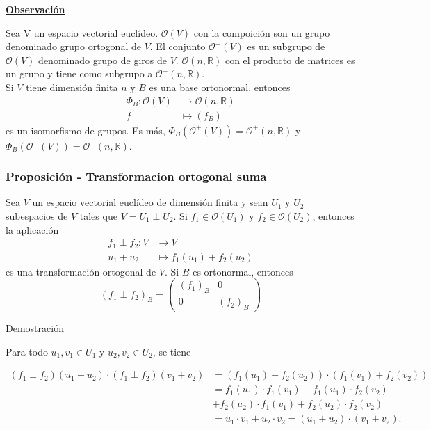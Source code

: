 \documentclass[12pt, a4paper, ones, notitlepage, openany,titlepage]{article}
\newcommand{\demostracion}{\noindent\underline{Demostración}}
\newcommand{\observacion}{\noindent\underline{\textbf{Observación}}}
\begin{document}
\observacion

Sea V un espacio vectorial euclídeo. $\mathcal{O}(V)$ con la compoición son un grupo denominado grupo ortogonal de $V$. El conjunto $\mathcal{O}^+(V)$ es un subgrupo de $\mathcal{O}(V)$ denominado grupo de giros de $V$. $\mathcal{O}(n,\mathbb{R})$ con el producto de matrices es un grupo y tiene como subgrupo a $\mathcal{O}^+(n, \mathbb{R})$.\\
Si $V$ tiene dimensión finita $n$ y $B$ es una base ortonormal, entonces
$$
\begin{aligned}
	\Phi_B : \mathcal{O}(V) & \longrightarrow \mathcal{O}(n,\mathbb{R}) \\
	f & \longmapsto (f_B)
\end{aligned}
$$
\noindent es un isomorfismo de grupos. Es más, $\Phi_B(\mathcal{O}^+(V)) = \mathcal{O}^+(n, \mathbb{R})$ y $\Phi_B(\mathcal{O}^-(V)) = \mathcal{O}^-(n, \mathbb{R})$. 

\subsubsection{Proposición - Transformacion ortogonal suma}
Sea $V$ un espacio vectorial euclídeo de dimensión finita y sean $U_{1}$ y $U_{2}$ subespacios de $V$ tales que $V=U_{1} \perp U_{2}$. Si $f_{1} \in \mathcal{O}\left(U_{1}\right)$ y $f_{2} \in \mathcal{O}\left(U_{2}\right)$, entonces la aplicación
$$
\begin{aligned}
	f_{1} \perp f_{2}: V & \longrightarrow V \\
	u_1 + u_2 & \longmapsto f_1(u_1) + f_2(u_2)
\end{aligned}
$$
\noindent es una transformación ortogonal de $V$. Si $B$ es ortonormal, entonces
$$
(f_1 \perp f_2)_B = 
\left(\begin{array}{c|c}
	(f_1)_B & 0 \\
	\hline
	0 & (f_2)_B
\end{array}\right)
$$

\demostracion

\noindent Para todo $u_{1}, v_{1} \in U_{1}$ y $u_{2}, v_{2} \in U_{2}$, se tiene

$$
\begin{aligned}
	\left(f_{1} \perp f_{2}\right)\left(u_{1}+u_{2}\right) \cdot\left(f_{1} \perp f_{2}\right)\left(v_{1}+v_{2}\right) & =\left(f_{1}\left(u_{1}\right)+f_{2}\left(u_{2}\right)\right) \cdot\left(f_{1}\left(v_{1}\right)+f_{2}\left(v_{2}\right)\right) \\
	& =f_{1}\left(u_{1}\right) \cdot f_{1}\left(v_{1}\right)+f_{1}\left(u_{1}\right) \cdot f_{2}\left(v_{2}\right) \\
	& +f_{2}\left(u_{2}\right) \cdot f_{1}\left(v_{1}\right)+f_{2}\left(u_{2}\right) \cdot f_{2}\left(v_{2}\right) \\
	& =u_{1} \cdot v_{1}+u_{2} \cdot v_{2}=\left(u_{1}+u_{2}\right) \cdot\left(v_{1}+v_{2}\right) .
\end{aligned}
$$
\end{document}
